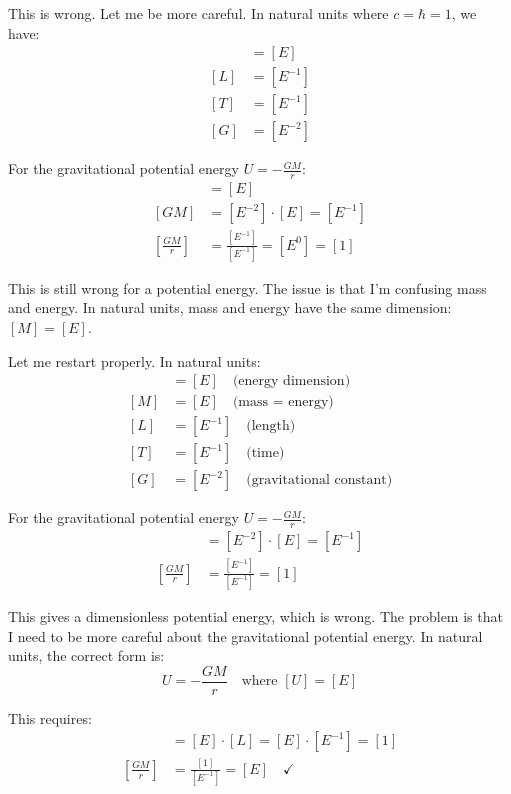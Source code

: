 \documentclass[12pt,a4paper]{report}
\begin{document}
	This is wrong. Let me be more careful. In natural units where $c = \hbar = 1$, we have:
	\begin{align}
		[E] &= [E] \\
		[L] &= [E^{-1}] \\
		[T] &= [E^{-1}] \\
		[G] &= [E^{-2}]
	\end{align}
	
	For the gravitational potential energy $U = -\frac{GM}{r}$:
	\begin{align}
		[U] &= [E] \\
		[GM] &= [E^{-2}] \cdot [E] = [E^{-1}] \\
		\left[\frac{GM}{r}\right] &= \frac{[E^{-1}]}{[E^{-1}]} = [E^0] = [1]
	\end{align}
	
	This is still wrong for a potential energy. The issue is that I'm confusing mass and energy. In natural units, mass and energy have the same dimension: $[M] = [E]$.
	
	Let me restart properly. In natural units:
	\begin{align}
		[E] &= [E] \quad \text{(energy dimension)} \\
		[M] &= [E] \quad \text{(mass = energy)} \\
		[L] &= [E^{-1}] \quad \text{(length)} \\
		[T] &= [E^{-1}] \quad \text{(time)} \\
		[G] &= [E^{-2}] \quad \text{(gravitational constant)}
	\end{align}
	
	For the gravitational potential energy $U = -\frac{GM}{r}$:
	\begin{align}
		[GM] &= [E^{-2}] \cdot [E] = [E^{-1}] \\
		\left[\frac{GM}{r}\right] &= \frac{[E^{-1}]}{[E^{-1}]} = [1]
	\end{align}
	
	This gives a dimensionless potential energy, which is wrong. The problem is that I need to be more careful about the gravitational potential energy. In natural units, the correct form is:
	\begin{equation}
		U = -\frac{GM}{r} \quad \text{where } [U] = [E]
	\end{equation}
	
	This requires:
	\begin{align}
		[GM] &= [E] \cdot [L] = [E] \cdot [E^{-1}] = [1] \\
		\left[\frac{GM}{r}\right] &= \frac{[1]}{[E^{-1}]} = [E] \quad \checkmark
	\end{align}
	
\end{document}
